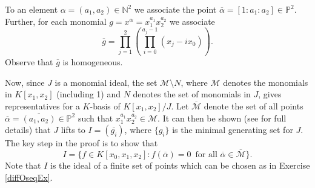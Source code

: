 \documentclass[11pt,twoside]{amsart}
\numberwithin{equation}{section}
\theoremstyle{definition}
\begin{document}
To an element $\alpha = (a_1, a_2) \in \mathbb N^2$ we associate the 
point $\overline{\alpha} = [1:a_1:a_2] \in \mathbb P^2$.  Further, for each 
monomial $g = x^{\alpha} = x_1^{a_1}x_2^{a_2}$ we associate 
$$\overline{g} = \prod_{j=1}^2\left(\prod_{i=0}^{a_j-1}(x_j-ix_0)\right).$$
Observe that $\overline{g}$ is homogeneous.  

Now, since $J$ is a monomial ideal, the set ${\mathcal M} \setminus N$, where ${\mathcal M}$ 
denotes the monomials in ${K}[x_1, x_2]$ (including 1) and $N$ denotes 
the set of monomials in $J$, gives representatives for a ${K}$-basis of 
${K}[x_1, x_2]/J$.  Let $\overline{{\mathcal M}}$ denote the set of all points 
$\overline{\alpha} = \overline{(a_1, a_2)} \in \mathbb P^2$ such that 
$x_1^{a_1}x_2^{a_2} \in {\mathcal M}$.  It can then be shown (see \cite{refGGR} 
for full details) that $J$ lifts to $I = (\overline{g_i})$, where $\{g_i\}$ is 
the minimal generating set for $J$.  The key step in the proof is to show that
$$I = \{f \in {K}[x_0, x_1, x_2] : f(\overline{\alpha}) = 
0 \,\,\, \mbox{for all $\overline{\alpha} \in \overline{{\mathcal M}}$}\}.$$
Note that $I$ is the ideal of a 
finite set of points which can be chosen as in Exercise \ref{diffOseqEx}.
\end{document}
